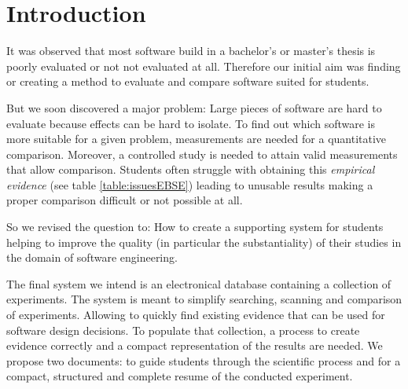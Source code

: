 

\section{Introduction}
\label{sec:introduction}

It was observed that most software build in a bachelor's or master's thesis is poorly evaluated or not not evaluated at all. Therefore our initial aim was finding or creating a method to evaluate and compare software suited for students.

But we soon discovered a major problem: Large pieces of software are hard to evaluate because effects can be hard to isolate.
To find out which software  is more suitable for a given problem, measurements are needed for a quantitative comparison. Moreover, a controlled study is needed to attain valid measurements that allow comparison. Students often struggle with obtaining this \emph{empirical evidence} (see table \ref{table:issuesEBSE}) leading to unusable results making a proper comparison difficult or not possible at all. 

So we revised the question to: How to create a supporting system for students helping to improve the quality (in particular the substantiality) of their studies in the domain of software engineering.

The final system we intend is an electronical database containing a collection of experiments. The system is meant to simplify searching, scanning and comparison of experiments. Allowing to quickly find existing evidence that can be used for software design decisions. To populate that collection, a process to create evidence correctly and a compact representation of the results are needed. We propose two documents: \emph{\checklist} to guide students through the scientific process and \emph{\briefingform} for a compact, structured and complete resume of the conducted experiment. 


